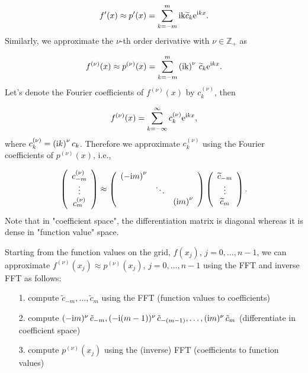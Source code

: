 \documentclass[12pt,landscape]{article}
\begin{document}
{\[
f'(x) \approx p'(x) = \sum_{k=-m}^{m} {\rm i k}\widetilde{c}_k{\rm e}^{{\rm i}kx}.
\]
Similarly, we approximate the $\nu$-th order derivative with $\nu \in \mathbb{Z}_+$ as

\[
f^{(\nu)}(x) \approx p^{(\nu)}(x) = \sum_{k=-m}^{m} \left({\rm i k}\right)^{\nu}\,\widetilde{c}_k{\rm e}^{{\rm i}kx}.
\]
Let's denote the Fourier coefficients of $f^{(\nu)}(x)$ by $c_k^{(\nu)}$, then

\[
f^{(\nu)}(x) = \sum_{k=-\infty}^{\infty}c_k^{(\nu)}{\rm e}^{{\rm i}kx},
\]
where $c_k^{(\nu)} =  \left( {\rm i}k \right)^{\nu} c_k$.  Therefore we approximate $c_k^{(\nu)}$ using the Fourier coefficients of $p^{(\nu)}(x)$, i.e.,

\[
\left(
\begin{array}{c}
c_{-m}^{(\nu)} \\
\vdots \\
c_{m}^{(\nu)}
\end{array}
\right) \approx
\left(
\begin{array}{c c c}
\left(-{\rm i}m\right)^{\nu} &  &   \\
   & \ddots &    \\
   &        & \left({\rm i}m\right)^{\nu}
\end{array}
\right)
\left(
\begin{array}{c}
\widetilde{c}_{-m} \\
\vdots \\
\widetilde{c}_{m}
\end{array}
\right).
\]
Note that in "coefficient space", the differentiation matrix is diagonal whereas it is dense in "function value" space.  

Starting from the function values on the grid, $f(x_j)$, $j = 0, \ldots, n-1$, we can approximate $f^{(\nu)}(x_j) \approx p^{(\nu)}(x_j)$, $j = 0, \ldots, n-1$ using the FFT and inverse FFT as follows:

\begin{itemize}
\item[1. ] compute $\tilde{c}_{-m}, \ldots, \tilde{c}_{m}$ using the FFT  (function values to coefficients)


\item[2. ] compute $(-{\rm i}m)^{\nu}\,\tilde{c}_{-m}, (-{\rm i}(m-1))^{\nu}\,\tilde{c}_{-(m-1)}, \ldots, ({\rm i}m)^{\nu}\,\tilde{c}_{m}$ (differentiate in coefficient space)


\item[3. ] compute $p^{(\nu)}(x_j)$ using the (inverse) FFT  (coefficients to function values)


\end{itemize}}
\end{document}
